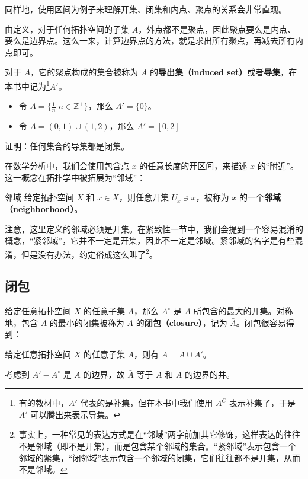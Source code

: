 同样地，使用区间为例子来理解开集、闭集和内点、聚点的关系会非常直观。

由定义，对于任何拓扑空间的子集 $A$，外点都不是聚点，因此聚点要么是内点、要么是边界点。这么一来，计算边界点的方法，就是求出所有聚点，再减去所有内点即可。

对于 $A$，它的聚点构成的集合被称为 $A$ 的\textbf{导出集（induced set）}或者\textbf{导集}，在本书中记为\footnote{有的教材中，$A'$ 代表的是补集，但在本书中我们使用 $A^C$ 表示补集了，于是 $A'$ 可以腾出来表示导集。}$A'$。

\begin{example}{}
\begin{itemize}
\item 令 $A=\{\frac{1}{n}|n\in\mathbb{Z}^+\}$，那么 $A'=\{0\}$。
\item 令 $A=(0,1)\cup(1,2)$，那么 $A'=[0,2]$
\end{itemize}
\end{example}

\begin{exercise}{}
证明：任何集合的导集都是闭集。
\end{exercise}

在数学分析中，我们会使用包含点 $x$ 的任意长度的开区间，来描述 $x$ 的“附近”。这一概念在拓扑学中被拓展为“邻域”：

\begin{definition}{邻域}
给定拓扑空间 $X$ 和 $x\in X$，则任意开集 $U_x\ni x$，被称为 $x$ 的一个\textbf{邻域（neighborhood）}。
\end{definition}

注意，这里定义的邻域必须是开集。在紧致性一节中，我们会提到一个容易混淆的概念，“紧邻域”，它并不一定是开集，因此不一定是邻域。紧邻域的名字是有些混淆，但是没有办法，约定俗成这么叫了\footnote{事实上，一种常见的表达方式是在“邻域”两字前加其它修饰，这样表达的往往不是邻域（即不是开集），而是包含某个邻域的集合。“紧邻域”表示包含一个邻域的紧集，“闭邻域”表示包含一个邻域的闭集，它们往往都不是开集，从而不是邻域。}。



\subsection{闭包}

给定任意拓扑空间 $X$ 的任意子集 $A$，那么 $A^\circ$ 是 $A$ 所包含的最大的开集。对称地，包含 $A$ 的最小的闭集被称为 $A$ 的\textbf{闭包（closure）}，记为 $\bar{A}$。闭包很容易得到：

\begin{theorem}{}
给定任意拓扑空间 $X$ 的任意子集 $A$，则有 $\bar{A}=A\cup A'$。
\end{theorem}
\begin{corollary}{}\label{Topo0_cor1}
考虑到 $A'-A^\circ$ 是 $A$ 的边界，故 $\bar{A}$ 等于 $A$ 和 $A$ 的边界的并。
\end{corollary}

